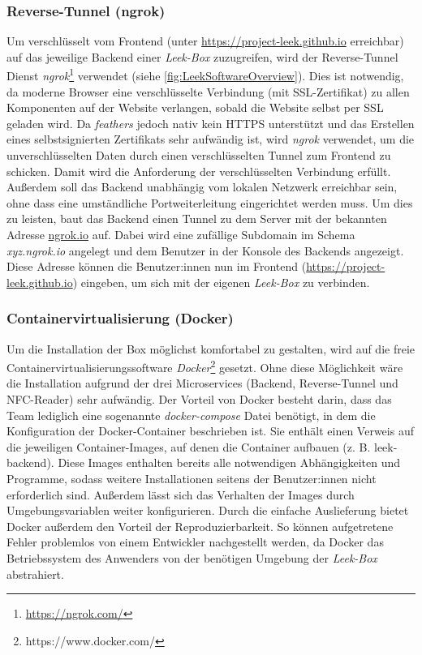 \documentclass[10pt, a4paper]{article}
\begin{document}
\begin{onehalfspace}
  \subsubsection{Reverse-Tunnel (ngrok)}
  \label{kapitel:ngrok}
  Um verschlüsselt vom Frontend (unter \url{https://project-leek.github.io} erreichbar) auf das jeweilige Backend einer \textit{Leek-Box} zuzugreifen, wird der Reverse-Tunnel Dienst \textit{ngrok}\footnote{\raggedright\url{https://ngrok.com/}} verwendet (siehe \autoref{fig:LeekSoftwareOverview}).
  Dies ist notwendig, da moderne Browser eine verschlüsselte Verbindung (mit SSL-Zertifikat) zu allen Komponenten auf der Website verlangen, sobald die Website selbst per SSL geladen wird.
  Da \textit{feathers} jedoch nativ kein HTTPS unterstützt und das Erstellen eines selbstsignierten Zertifikats sehr aufwändig ist, wird \textit{ngrok} verwendet, um die unverschlüsselten Daten durch einen verschlüsselten Tunnel zum Frontend zu schicken. Damit wird die Anforderung der verschlüsselten Verbindung erfüllt.
  Außerdem soll das Backend unabhängig vom lokalen Netzwerk erreichbar sein, ohne dass eine umständliche Portweiterleitung eingerichtet werden muss. Um dies zu leisten, baut das Backend einen Tunnel zu dem Server mit der bekannten Adresse \url{ngrok.io} auf.
  Dabei wird eine zufällige Subdomain im Schema \textit{xyz.ngrok.io} angelegt und dem Benutzer in der Konsole des Backends angezeigt. Diese Adresse können die Benutzer:innen nun im Frontend (\url{https://project-leek.github.io}) eingeben, um sich mit der eigenen \textit{Leek-Box} zu verbinden.


  \subsubsection{Containervirtualisierung (Docker)}
  \label{abschnitt:docker}
  Um die Installation der Box möglichst komfortabel zu gestalten, wird auf die freie Containervirtualisierungssoftware \textit{Docker}\footnote{https://www.docker.com/} gesetzt.
  Ohne diese Möglichkeit wäre die Installation aufgrund der drei Microservices (Backend, Reverse-Tunnel und NFC-Reader) sehr aufwändig.
  Der Vorteil von Docker besteht darin, dass das Team lediglich eine sogenannte \textit{docker-compose} Datei benötigt, in dem die Konfiguration der Docker-Container beschrieben ist.
  Sie enthält einen Verweis auf die jeweiligen Container-Images, auf denen die Container aufbauen (z. B. leek-backend). Diese Images enthalten bereits alle notwendigen Abhängigkeiten und Programme,
  sodass weitere Installationen seitens der Benutzer:innen nicht erforderlich sind.
  Außerdem lässt sich das Verhalten der Images durch Umgebungsvariablen weiter konfigurieren. Durch die einfache Auslieferung bietet Docker außerdem den Vorteil der Reproduzierbarkeit.
  So können aufgetretene Fehler problemlos von einem Entwickler nachgestellt werden, da Docker das Betriebssystem des Anwenders von der benötigen Umgebung der \textit{Leek-Box} abstrahiert.



\end{onehalfspace}
\end{document}
